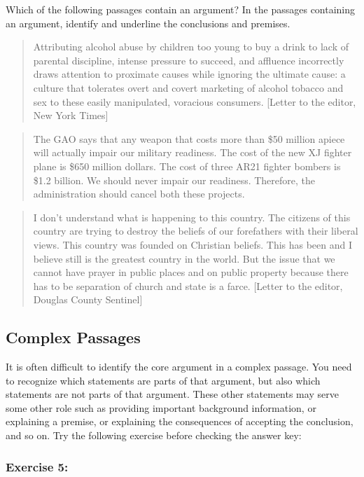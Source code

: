 \documentclass[]{article}
\begin{document}
Which of the following passages contain an argument? In the passages
containing an argument, identify and underline the conclusions and
premises.

\begin{quote}
Attributing alcohol abuse by children too young to buy a drink to lack
of parental discipline, intense pressure to succeed, and affluence
incorrectly draws attention to proximate causes while ignoring the
ultimate cause: a culture that tolerates overt and covert marketing of
alcohol tobacco and sex to these easily manipulated, voracious
consumers. {[}Letter to the editor, New York Times{]}
\end{quote}

\begin{quote}
The GAO says that any weapon that costs more than \$50 million apiece
will actually impair our military readiness. The cost of the new XJ
fighter plane is \$650 million dollars. The cost of three AR21 fighter
bombers is \$1.2 billion. We should never impair our readiness.
Therefore, the administration should cancel both these projects.
\end{quote}

\begin{quote}
I don't understand what is happening to this country. The citizens of
this country are trying to destroy the beliefs of our forefathers with
their liberal views. This country was founded on Christian beliefs. This
has been and I believe still is the greatest country in the world. But
the issue that we cannot have prayer in public places and on public
property because there has to be separation of church and state is a
farce. {[}Letter to the editor, Douglas County Sentinel{]}
\end{quote}

\subsection{Complex Passages}\label{complex-passages}

It is often difficult to identify the core argument in a complex
passage. You need to recognize which statements are parts of that
argument, but also which statements are not parts of that argument.
These other statements may serve some other role such as providing
important background information, or explaining a premise, or explaining
the consequences of accepting the conclusion, and so on. Try the
following exercise before checking the answer key:

\subsubsection{Exercise 5:}\label{exercise-5}
\end{document}

